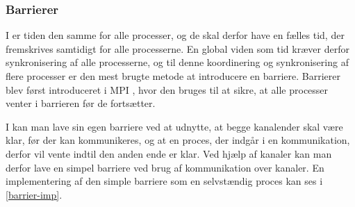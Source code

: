\subsubsection{Barrierer} 
\label{sec:barrierer}
I \des er tiden den samme for alle processer, og de skal derfor have en fælles tid, der fremskrives samtidigt for alle processerne. En global viden som tid kræver derfor synkronisering af alle 
processerne, og til denne koordinering og synkronisering af flere 
processer er  den mest brugte metode at introducere en barriere. Barrierer blev først introduceret i MPI \cite{mpi-barrier}, hvor den bruges til at 
sikre, at alle processer venter i barrieren før de  fortsætter. 

I \csp kan man lave sin egen barriere ved at udnytte, at begge 
kanalender skal være klar, før der kan kommunikeres, og at en proces, der 
indgår i en kommunikation, derfor vil vente indtil den anden ende er klar. Ved hjælp af kanaler kan man derfor lave en simpel barriere 
 ved brug af kommunikation over kanaler.  En implementering af den simple 
barriere som en selvstændig proces kan ses i \cref{barrier-imp}.

